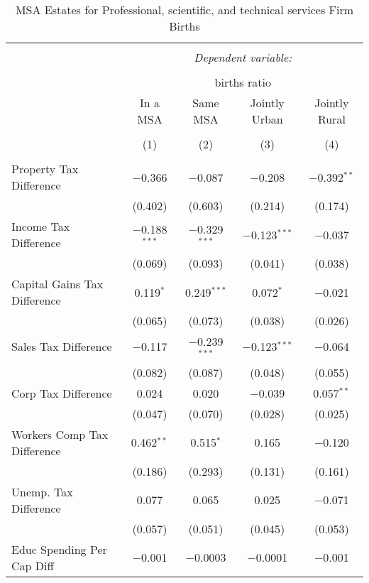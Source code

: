 
\begin{table}[!htbp] \centering 
  \caption{MSA Estates for  Professional, scientific, and technical services Firm Births} 
  \label{} 
\begin{tabular}{@{\extracolsep{5pt}}lcccc} 
\\[-1.8ex]\hline 
\hline \\[-1.8ex] 
 & \multicolumn{4}{c}{\textit{Dependent variable:}} \\ 
\cline{2-5} 
\\[-1.8ex] & \multicolumn{4}{c}{births ratio} \\ 
 & In a MSA & Same MSA & Jointly Urban & Jointly Rural \\ 
\\[-1.8ex] & (1) & (2) & (3) & (4)\\ 
\hline \\[-1.8ex] 
 Property Tax Difference & $-$0.366 & $-$0.087 & $-$0.208 & $-$0.392$^{**}$ \\ 
  & (0.402) & (0.603) & (0.214) & (0.174) \\ 
  Income Tax Difference & $-$0.188$^{***}$ & $-$0.329$^{***}$ & $-$0.123$^{***}$ & $-$0.037 \\ 
  & (0.069) & (0.093) & (0.041) & (0.038) \\ 
  Capital Gains Tax Difference & 0.119$^{*}$ & 0.249$^{***}$ & 0.072$^{*}$ & $-$0.021 \\ 
  & (0.065) & (0.073) & (0.038) & (0.026) \\ 
  Sales Tax Difference & $-$0.117 & $-$0.239$^{***}$ & $-$0.123$^{***}$ & $-$0.064 \\ 
  & (0.082) & (0.087) & (0.048) & (0.055) \\ 
  Corp Tax Difference & 0.024 & 0.020 & $-$0.039 & 0.057$^{**}$ \\ 
  & (0.047) & (0.070) & (0.028) & (0.025) \\ 
  Workers Comp Tax Difference & 0.462$^{**}$ & 0.515$^{*}$ & 0.165 & $-$0.120 \\ 
  & (0.186) & (0.293) & (0.131) & (0.161) \\ 
  Unemp. Tax Difference & 0.077 & 0.065 & 0.025 & $-$0.071 \\ 
  & (0.057) & (0.051) & (0.045) & (0.053) \\ 
  Educ Spending Per Cap Diff & $-$0.001 & $-$0.0003 & $-$0.0001 & $-$0.001 \\ 

\end{tabular}
\end{table}
